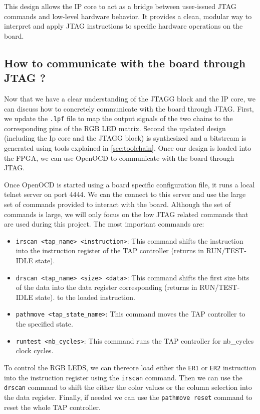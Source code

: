 \documentclass[a4paper,11pt,oneside]{report}
\begin{document}
This design allows the IP core to act as a bridge between user-issued JTAG commands and
low-level hardware behavior. It provides a clean, modular way to interpret and apply JTAG
instructions to specific hardware operations on the board.

\subsection{How to communicate with the board through JTAG ?} 

Now that we have a clear understanding of the JTAGG block and the IP core, we can discuss how to concretely communicate with the board through JTAG.
First, we update the \texttt{.lpf} file to map the output signals of the two chains to the corresponding pins of the RGB LED matrix.
Second the updated design (including the Ip core and the JTAGG block) is synthesized and a bitstream is generated using tools explained in \ref{sec:toolchain}.
Once our design is loaded into the FPGA, we can use OpenOCD to communicate with the board through JTAG.

Once OpenOCD is started using a board specific configuration file, it runs a local telnet server on port 4444.
We can the connect to this server and use the large set of commands provided to interact with the board.
Although the set of commands is large, we will only focus on the low JTAG related commands that are used during this project.
The most important commands are:
\begin{itemize}
    \item \verb|irscan <tap_name> <instruction>|: This command shifts the instruction into the instruction register of the TAP controller (returns in RUN/TEST-IDLE state).
    \item \verb|drscan <tap_name> <size> <data>|: This command shifts the first size bits of the data into the data register corresponding (returns in RUN/TEST-IDLE state).
    to the loaded instruction.
    \item \verb|pathmove <tap_state_name>|: This command moves the TAP controller to the specified state.
    \item \verb|runtest <nb_cycles>|: This command runs the TAP controller for nb\_cycles clock cycles.
\end{itemize}

To control the RGB LEDS, we can thereore load either the \texttt{ER1} or \texttt{ER2} instruction into the instruction register using the \texttt{irscan} command.
Then we can use the \texttt{drscan} command to shift the either the color values or the column selection into the data register.
Finally, if needed we can use the \texttt{pathmove reset} command to reset the whole TAP controller.
\end{document}
